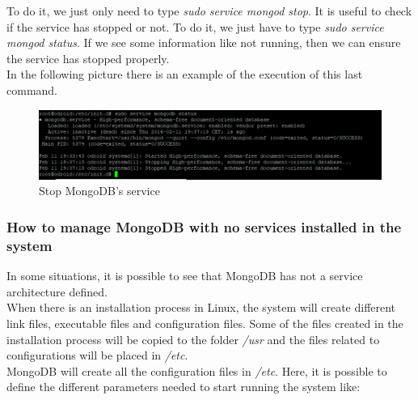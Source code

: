 To do it, we just only need to type \textit{sudo service mongod stop}. It is useful to check if the service has stopped or not. To do it, we just have to type \textit{sudo service mongod status}. If we see some information like not running, then we can ensure the service has stopped properly.\\

In the following picture there is an example of the execution of this last command.

\begin{figure}[H]
\begin{centering}
\includegraphics[scale=0.65]{IMGS/stop_mongodb_service.PNG}
\caption{Stop MongoDB's service \label{Stop MongoDB's service}}
\end{centering}
\end{figure}

\subsubsection{How to manage MongoDB with no services installed in the system}

In some situations, it is possible to see that MongoDB has not a service architecture defined.\\

When there is an installation process in Linux, the system will create different link files, executable files and configuration files. Some of the files created in the installation process will be copied to the folder \textit{/usr} and the files related to configurations will be placed in \textit{/etc}.\\

MongoDB will create all the configuration files in \textit{/etc}. Here, it is possible to define the different parameters needed to start running the system like:

